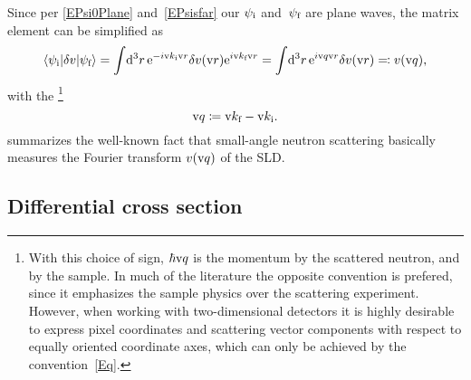 %
%
%
Since per \cref{EPsi0Plane} and~\cref{EPsisfar} our $\psi_\si$ and~$\psi_\sf$ are plane waves,
the matrix element can be simplified as
\begin{equation}\label{Echiq}
  \bra \psi_\si|\delta v|\psi_\sf\ket
  = \int\!\d^3r\, {\rm e}^{-i\k_\si\r}\delta v(\r){\rm e}^{i\k_\sf\r}
  = \int\!\d^3r\, {\rm e}^{i\q\r}\delta v(\r)
  \eqqcolon v(\q),
\end{equation}
%
with the \footnote
{With this choice of sign,
%
$\hbar\q$ is the momentum
%
 by the scattered neutron,
and  by the sample.
In much of the literature the opposite convention is prefered,
since it emphasizes the sample physics over the scattering experiment.
However, when working with two-dimensional detectors
it is highly desirable to express pixel coordinates
and scattering vector components
with respect to equally oriented coordinate axes,
which can only be achieved by the convention~\cref{Eq}.}
%
\begin{equation}\label{Eq}
  \q\coloneqq \k_\sf-\k_\si.
\end{equation}
%
 summarizes the well-known fact that
small-angle neutron scattering basically measures
the Fourier transform $v(\q)$ of the SLD.
%
%

%


\subsection{Differential cross section}\label{SdiffCross}

